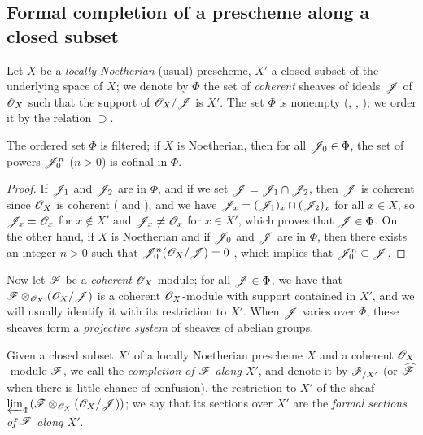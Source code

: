 \subsection{Formal completion of a prescheme along a closed subset}
\label{subsection-formal-completion-along-closed-subset}

\begin{env}[10.8.1]
\label{1.10.8.1}
Let $X$ be a \emph{locally Noetherian} (usual) prescheme, $X'$ a closed subset of the underlying space of $X$; we denote by $\Phi$ the set of \emph{coherent} sheaves of ideals $\mathscr{J}$ of $\mathscr{O}_X$ such that the support of $\mathscr{O}_X/\mathscr{J}$ is $X'$.
The set $\Phi$ is nonempty (, , ); we order it by the relation $\supset$.
\end{env}

\begin{lem}[10.8.2]
\label{1.10.8.2}
The ordered set $\Phi$ is filtered; if $X$ is Noetherian, then for all $\mathscr{J}_0\in\Phi$, the set of powers $\mathscr{J}_0^n$ ($n>0$) is cofinal in $\Phi$.
\end{lem}

\begin{proof}
\label{proof-1.10.8.2}
If $\mathscr{J}_1$ and $\mathscr{J}_2$ are in $\Phi$, and if we set $\mathscr{J}=\mathscr{J}_1\cap\mathscr{J}_2$, then $\mathscr{J}$ is coherent since $\mathscr{O}_X$ is coherent ( and ), and we have $\mathscr{J}_x=(\mathscr{J}_1)_x\cap(\mathscr{J}_2)_x$ for all $x\in X$, so $\mathscr{J}_x=\mathscr{O}_x$ for $x\not\in X'$ and $\mathscr{J}_x\neq\mathscr{O}_x$ for $x\in X'$, which proves that $\mathscr{J}\in\Phi$.
On the other hand, if $X$ is Noetherian and if $\mathscr{J}_0$ and $\mathscr{J}$ are in $\Phi$, then there exists an integer $n>0$ such that $\mathscr{J}_0^n(\mathscr{O}_X/\mathscr{J})=0$ , which implies that $\mathscr{J}_0^n\subset\mathscr{J}$.
\end{proof}

\begin{env}[10.8.3]
\label{1.10.8.2}
Now let $\mathscr{F}$ be a \emph{coherent} $\mathscr{O}_X$-module; for all $\mathscr{J}\in\Phi$, we have that $\mathscr{F}\otimes_{\mathscr{O}_X}(\mathscr{O}_X/\mathscr{J})$ is a coherent $\mathscr{O}_X$-module  with support contained in $X'$, and we will usually identify it with its restriction to $X'$.
When $\mathscr{J}$ varies over $\Phi$, these sheaves form a \emph{projective system} of sheaves of abelian groups.
\end{env}

\begin{defn}[10.8.4]
\label{1.10.8.4}
Given a closed subset $X'$ of a locally Noetherian prescheme $X$ and a coherent $\mathscr{O}_X$-module $\mathscr{F}$, we call the \emph{completion of $\mathscr{F}$ along $X'$}, and denote it by $\mathscr{F}_{/X'}$ (or $\widehat{\mathscr{F}}$ when there is little chance of confusion), the restriction to $X'$ of the sheaf
$\varprojlim_\Phi(\mathscr{F}\otimes_{\mathscr{O}_X}(\mathscr{O}_X/\mathscr{J}))$; we say that its sections over $X'$ are the \emph{formal sections of $\mathscr{F}$ along $X'$}.
\end{defn}

